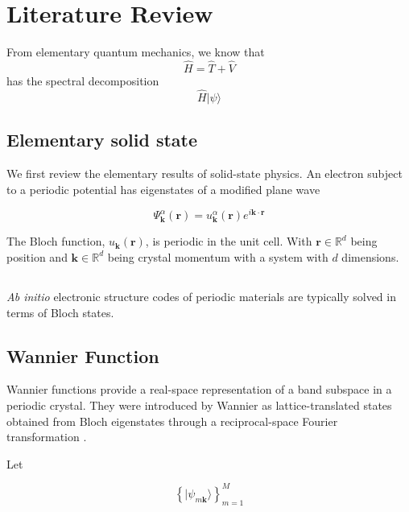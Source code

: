 \section{Literature Review}

From elementary quantum mechanics, we know that
\begin{equation}
\hat{H} = \hat{T} + \hat{V}
\end{equation}
has the spectral decomposition
\begin{equation}
 \hat{H} |\psi \rangle
\end{equation}
\subsection{Elementary solid state}
We first review the elementary results of solid-state physics.  An electron subject to a periodic potential has eigenstates of a modified plane wave

$$
  \Psi_\mathbf{k}^\alpha (\mathbf{r})
  =
  u_\mathbf{k}^\alpha(\mathbf{r})
  e^{i \mathbf{k} \cdot \mathbf{r}}
$$

The Bloch function, $u_\mathbf{k}(\mathbf{r})$, is periodic in the unit cell. With $\mathbf{r}\in\mathbb{R}^d$ being position and $\mathbf{k}\in\mathbb{R}^d$ being crystal momentum with a system with $d$ dimensions.

\subsection{}
\emph{Ab initio} electronic structure codes of periodic materials are typically solved in terms of Bloch states.

\subsection{Wannier Function}
Wannier functions provide a real-space representation of a band subspace in a periodic crystal. They were introduced by Wannier\cite{wannier1937} as lattice-translated states obtained from Bloch eigenstates through a reciprocal-space Fourier transformation .

Let

\begin{equation}
  \left\{
    |\psi_{m\mathbf{k}}\rangle
  \right\}_{m=1}^{M}
\end{equation}

